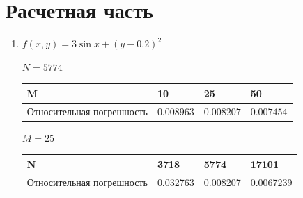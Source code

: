 \documentclass[14pt, a4paper]{extarticle}
\begin{document}
	\section{Расчетная часть}
		\begin{enumerate}
			\item \( f(x, y) = 3\sin{x} + (y - 0.2)^2 \)
			
			\(N = 5774\)
			\begin{table}[H]
				\centering
				\begin{tabular}{|P{5cm}|P{2.5cm}|P{2.5cm}|P{2.5cm}|}
					\hline
					M & 10 & 25 & 50 \\ \hline
					Относительная погрешность & $0.008963$ & $0.008207$ & $0.007454$\\ \hline
				\end{tabular}
			\end{table}
			
			\(M = 25\)
			\begin{table}[H]
				\centering
				\begin{tabular}{|P{5cm}|P{2.5cm}|P{2.5cm}|P{2.5cm}|}
					\hline
					N & 3718 & 5774 & 17101 \\ \hline
					Относительная погрешность & 0.032763 & 0.008207 & 0.0067239\\ \hline
				\end{tabular}
			\end{table}
		

\end{enumerate}
\end{document}
